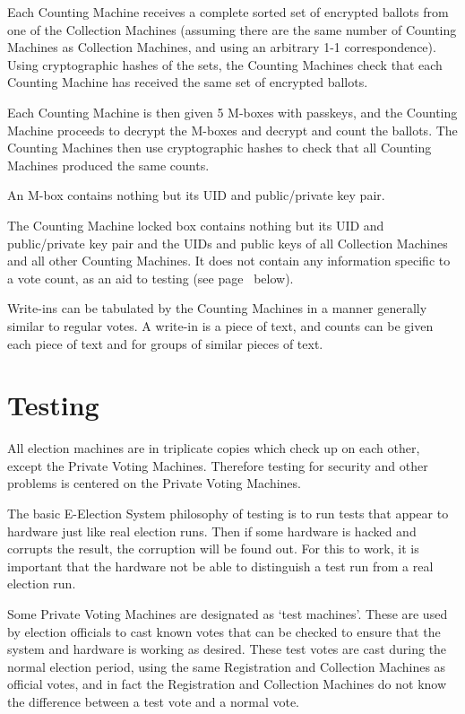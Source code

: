 \documentclass[12pt]{article}
\newcommand{\pagref}[1]{(see page~\pageref{#1} below)}
\begin{document}
Each Counting Machine receives a complete sorted set of encrypted ballots
from one of the Collection Machines (assuming there are the same
number of Counting Machines as Collection Machines, and using an
arbitrary 1-1 correspondence).
Using cryptographic hashes of the sets, the Counting
Machines check that each Counting Machine has received the same set
of encrypted ballots.

Each Counting Machine is then given 5 M-boxes with passkeys,
and the Counting Machine proceeds to decrypt the M-boxes and
decrypt and count the ballots.  The Counting Machines then use
cryptographic hashes to check
that all Counting Machines produced the same counts.

An M-box contains nothing but its UID and public/private key pair.

The Counting Machine locked box contains nothing but its
UID and public/private key pair and the UIDs
and public keys of all Collection Machines and all other Counting Machines.
It does not contain any information specific to a vote count,
as an aid to testing \pagref{TESTING}.

Write-ins can be tabulated by the Counting Machines in a manner
generally similar to regular votes.  A write-in is a piece of
text, and counts can be given each piece of text and for groups
of similar pieces of text.

\section{Testing}\label{TESTING}

All election machines are in triplicate copies which check up on each
other, except the Private Voting Machines.  Therefore testing
for security and other problems is centered on the Private Voting
Machines.

The basic E-Election System philosophy of testing is to run tests
that appear to hardware just like real election runs.  Then if
some hardware is hacked and corrupts the result, the corruption
will be found out.  For this to work, it is important that the
hardware not be able to distinguish a test run from a real election run.

Some Private Voting Machines are designated as
`test machines'\label{TEST-MACHINE}.
These are used by election officials to cast known votes that can
be checked to ensure that the system and hardware is working as
desired.  These test votes are cast during the normal election
period, using the same Registration and Collection Machines
as official votes, and in fact the Registration and Collection Machines
do not know the difference between a test vote and a normal vote.
\end{document}

